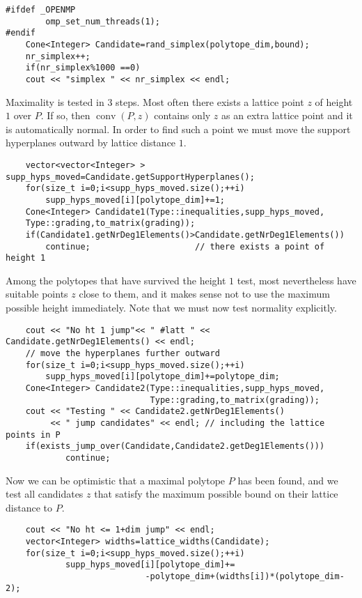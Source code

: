 \documentclass[12pt,a4paper]{scrartcl}
\theoremstyle{definition}
\begin{document}
\begin{small}
\begin{Verbatim}
#ifdef _OPENMP
        omp_set_num_threads(1);
#endif
    Cone<Integer> Candidate=rand_simplex(polytope_dim,bound);
    nr_simplex++;
    if(nr_simplex%1000 ==0)
    cout << "simplex " << nr_simplex << endl;
\end{Verbatim}
Maximality is tested in $3$ steps. Most often there exists a lattice point $z$ of height $1$ over $P$. If so, then $\operatorname{conv}(P,z)$ contains only $z$ as an extra lattice point and it is automatically normal. In order to find such a point we must move the support hyperplanes outward by lattice distance $1$.
\begin{Verbatim}
    vector<vector<Integer> > supp_hyps_moved=Candidate.getSupportHyperplanes();
    for(size_t i=0;i<supp_hyps_moved.size();++i)
        supp_hyps_moved[i][polytope_dim]+=1;
    Cone<Integer> Candidate1(Type::inequalities,supp_hyps_moved, 
    Type::grading,to_matrix(grading));
    if(Candidate1.getNrDeg1Elements()>Candidate.getNrDeg1Elements()) 
        continue;                     // there exists a point of height 1
\end{Verbatim}
Among the polytopes that have survived the height $1$ test, most nevertheless have suitable points $z$ close to them, and it makes sense not to use the maximum possible height immediately. Note that we must now test normality explicitly.
\begin{Verbatim}
    cout << "No ht 1 jump"<< " #latt " << Candidate.getNrDeg1Elements() << endl; 
    // move the hyperplanes further outward
    for(size_t i=0;i<supp_hyps_moved.size();++i)
        supp_hyps_moved[i][polytope_dim]+=polytope_dim; 
    Cone<Integer> Candidate2(Type::inequalities,supp_hyps_moved,
                             Type::grading,to_matrix(grading));
    cout << "Testing " << Candidate2.getNrDeg1Elements() 
         << " jump candidates" << endl; // including the lattice points in P
    if(exists_jump_over(Candidate,Candidate2.getDeg1Elements()))
            continue;
\end{Verbatim}
Now we can be optimistic that a maximal polytope $P$ has been found, and we test all candidates $z$ that satisfy the maximum possible bound on their lattice distance to $P$.
\begin{Verbatim}
    cout << "No ht <= 1+dim jump" << endl;
    vector<Integer> widths=lattice_widths(Candidate);
    for(size_t i=0;i<supp_hyps_moved.size();++i)
            supp_hyps_moved[i][polytope_dim]+=
                            -polytope_dim+(widths[i])*(polytope_dim-2);
\end{Verbatim}

\end{small}
\end{document}
